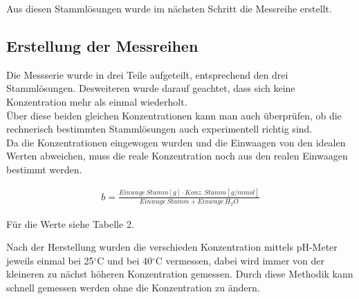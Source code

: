 Aus diesen Stammlösungen wurde im nächsten Schritt die Messreihe erstellt.




\subsection{Erstellung der Messreihen}

Die Messserie wurde in drei Teile aufgeteilt, entsprechend den drei Stammlösungen.
Desweiteren wurde darauf geachtet, dass sich keine Konzentration mehr als einmal 
wiederholt. \\ Über diese beiden gleichen Konzentrationen kann man auch überprüfen, ob
die rechnerisch bestimmten Stammlösungen auch experimentell richtig sind. \\
Da die Konzentrationen eingewogen wurden und die Einwaagen von den idealen Werten abweichen, muss die reale Konzentration
noch aus den realen Einwaagen bestimmt werden.

\begin{align}
  b = \frac{Einwage \, Stamm [g] \cdot Konz. \, Stamm [g/mmol]}{Einwage \, Stamm + Einwage \, H_2O}
\end{align}

Für die Werte siehe Tabelle 2.



Nach der Herstellung wurden die verschieden Konzentration mittels pH-Meter jeweils einmal bei
25$^\circ$C und bei 40$^\circ$C vermessen, dabei wird immer von der kleineren zu nächst höheren Konzentration gemessen.
Durch diese Methodik kann schnell gemessen werden ohne die Konzentration zu ändern.


